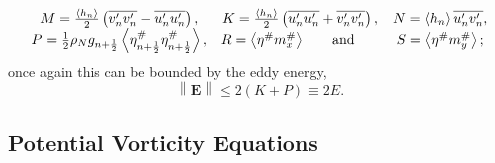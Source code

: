 \documentclass[12pt,a4paper]{report}
\newcommand*\thkmean[1]{\overline{#1}}
\newcommand*\thkres[1]{{#1}^{\prime}}
\newcommand*\nthkmean[1]{\left\langle{#1}\right\rangle}
\newcommand*\nthkres[1]{{#1}^{\#}}
\newcommand*{\half}{\frac{1}{2}}
\begin{document}
    \begin{equation}
    \label{epcomponentlabels}
    \begin{array}{ccc}
    M=\frac{\nthkmean{h_{n}}}{2}
    \left(\thkmean{\thkres{v}_{n}\thkres{v}_{n}}-\thkmean{\thkres{u}_{n}\thkres{u}_{n}}\right),& K=\frac{\nthkmean{h_{n}}}{2}
    \left(\thkmean{\thkres{u}_{n}\thkres{u}_{n}}+\thkmean{\thkres{v}_{n}\thkres{v}_{n}}\right),& N=\nthkmean{h_{n}}
    \thkmean{\thkres{u}_{n}\thkres{v}_{n}},\\ P=\half\rho_{N}g_{n+\half} \nthkmean{\nthkres{\eta}_{n+\half}\nthkres{\eta}_{n+\half}}, &
    R=\nthkmean{\nthkres{\eta}\nthkres{m}_{x}} \, \mbox{\hspace{5mm} and \hspace{5mm}}  & 
    S=\nthkmean{\nthkres{\eta}\nthkres{m}_{y}} ;\\
    \end{array}
    \end{equation} 
    once again this
    can be bounded by the eddy energy,
    \begin{equation}
    {\left\|\boldsymbol{E}\right\|\leq 2\left(K+P\right)\equiv 2E}.
    \label{energybound}
    \end{equation} 
    
    \subsection{Potential Vorticity Equations}
    \label{pvequations}
    
\end{document}
